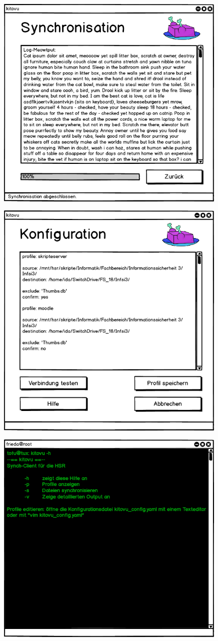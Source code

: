 \documentclass[a4paper]{article}
\begin{document}
	\includegraphics[width=30em]{./mockups/gui03.png}
	
	\includegraphics[width=30em]{./mockups/gui04.png}

	\includegraphics[width=30em]{./mockups/terminal01.png}
	
\end{document}
